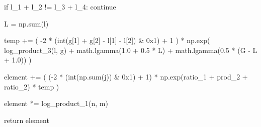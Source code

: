 \begin{python}
                                    if l_1 + l_2 != l_3 + l_4:
                                        continue

                                    L = np.sum(l)

                                    temp += (
                                        -2
                                        * (int(g[1] + g[2] - l[1] - l[2]) & 0x1)
                                        + 1
                                    ) * np.exp(
                                        log_product_3(l, g)
                                        + math.lgamma(1.0 + 0.5 * L)
                                        + math.lgamma(0.5 * (G - L + 1.0))
                                    )

                    element += (
                        (-2 * (int(np.sum(j)) & 0x1) + 1)
                        * np.exp(ratio_1 + prod_2 + ratio_2)
                        * temp
                    )

    element *= log_product_1(n, m)

    return element
\end{python}